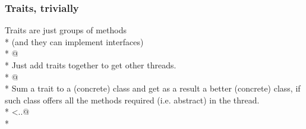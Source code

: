 \begin{frame}[fragile]
\frametitle{Traits, trivially}
Traits are just groups of methods
\\*
(and they can implement interfaces)
\\*
@
\\*
Just add traits together to get other threads.
\\*
@
\\*
Sum a trait to a (concrete) class and get
as a result a better (concrete) class, if such class offers all
the methods required (i.e. abstract) in the thread.
\\*
<{..}@
\\*


\end{frame}



